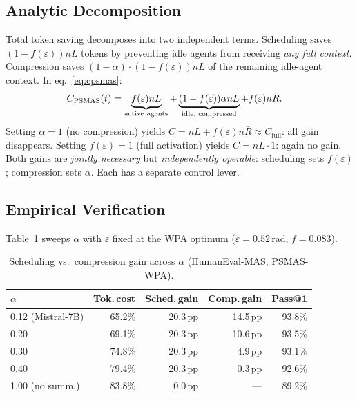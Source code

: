 \documentclass[10pt,twocolumn]{article}
\theoremstyle{plain}
\theoremstyle{definition}
\theoremstyle{remark}
\newcommand{\eps}{\varepsilon}
\begin{document}
\subsection{Analytic Decomposition}

Total token saving decomposes into two independent terms.  Scheduling
saves $(1-f(\eps))nL$ tokens by preventing idle agents from receiving
\emph{any full context}.  Compression saves $(1-\alpha)\cdot(1-f(\eps))nL$
of the remaining idle-agent context.  In eq.~\eqref{eq:cpsmas}:
\begin{align}
  C_\text{PSMAS}(t) &= \underbrace{f(\eps)nL}_{\text{active agents}}
  + \underbrace{(1-f(\eps))\alpha nL}_{\text{idle, compressed}}
  + f(\eps)n\bar{R}. \notag
\end{align}
Setting $\alpha=1$ (no compression) yields
$C=nL+f(\eps)n\bar{R}\approx C_\text{full}$: all gain disappears.
Setting $f(\eps)=1$ (full activation) yields $C=nL\cdot1$: again
no gain.  Both gains are \emph{jointly necessary} but \emph{independently
operable}: scheduling sets $f(\eps)$; compression sets $\alpha$.
Each has a separate control lever.

\subsection{Empirical Verification}
\label{sec:alpha_sweep}

Table~\ref{tab:alpha} sweeps $\alpha$ with $\eps$ fixed at the WPA
optimum ($\eps=0.52$\,rad, $f=0.083$).

\begin{table}[h]
\centering\scriptsize
\caption{Scheduling vs.\ compression gain across $\alpha$ (HumanEval-MAS, PSMAS-WPA).}
\label{tab:alpha}
\setlength{\tabcolsep}{3pt}
\begin{tabular}{@{}lrrrr@{}}
\toprule
$\alpha$ & Tok.\,cost & Sched.\,gain & Comp.\,gain & Pass@1\\
\midrule
0.12 (Mistral-7B) & 65.2\% & 20.3\,pp & 14.5\,pp & 93.8\%\\
0.20              & 69.1\% & 20.3\,pp & 10.6\,pp & 93.5\%\\
0.30              & 74.8\% & 20.3\,pp &  4.9\,pp & 93.1\%\\
0.40              & 79.4\% & 20.3\,pp &  0.3\,pp & 92.6\%\\
1.00 (no summ.)   & 83.8\% &  0.0\,pp & \,---      & 89.2\%\\
\bottomrule
\end{tabular}
\end{table}
\end{document}
